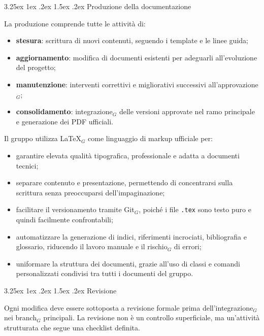 \documentclass[a4paper, 10pt]{article}
\makeatletter
\renewcommand\paragraph{\@startsection{paragraph}{4}{\z@}%
  {3.25ex \@plus1ex \@minus .2ex}%
  {1.5ex \@plus .2ex}%
  {\normalfont\normalsize\bfseries}}
\makeatother
\begin{document}
\paragraph{Produzione della documentazione}

La produzione comprende tutte le attività di:
\begin{itemize}
    \item \textbf{stesura}: scrittura di nuovi contenuti, seguendo i template e le linee guida;
    \item \textbf{aggiornamento}: modifica di documenti esistenti per adeguarli all'evoluzione del progetto;
    \item \textbf{manutenzione}: interventi correttivi e migliorativi successivi all'approvazione$_G$;
    \item \textbf{consolidamento}: integrazione$_G$ delle versioni approvate nel ramo principale e generazione dei PDF ufficiali.
\end{itemize}

Il gruppo utilizza \LaTeX$_G$ come linguaggio di markup ufficiale per:
\begin{itemize}
    \item garantire elevata qualità tipografica, professionale e adatta a documenti tecnici;
    \item separare contenuto e presentazione, permettendo di concentrarsi sulla scrittura senza preoccuparsi dell'impaginazione;
    \item facilitare il versionamento tramite Git$_G$, poiché i file \texttt{.tex} sono testo puro e quindi facilmente confrontabili;
    \item automatizzare la generazione di indici, riferimenti incrociati, bibliografia e glossario, riducendo il lavoro manuale e il rischio$_G$ di errori;
    \item uniformare la struttura dei documenti, grazie all'uso di classi e comandi personalizzati condivisi tra tutti i documenti del gruppo.
\end{itemize}

\paragraph{Revisione}

Ogni modifica deve essere sottoposta a revisione formale prima dell'integrazione$_G$ nei branch$_G$ principali. La revisione non è un controllo superficiale, ma un'attività strutturata che segue una checklist definita.
\end{document}
